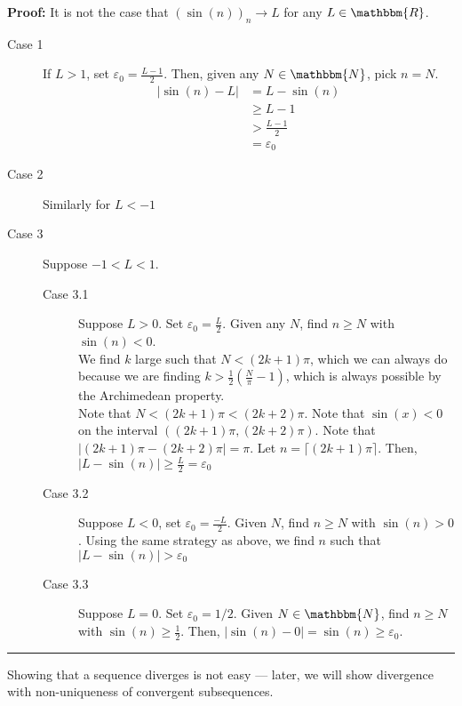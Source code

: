 \documentclass[10pt]{extarticle}
\newcommand{\N}{\mathbbm{N}}
\newcommand{\R}{\mathbbm{R}}
\begin{document}
      \textbf{Proof:} It is not the case that $\left(\sin(n)\right)_n \rightarrow L$ for any $L\in\R$.
      \begin{description}
        \item[Case 1] If $L > 1$, set $\varepsilon_0 = \frac{L-1}{2}$. Then, given any $N\in\N$, pick $n = N$.
          \begin{align*}
            |\sin(n)-L| &= L-\sin(n)\\
                        &\geq L-1\\
                        &> \frac{L-1}{2}\\
                        &= \varepsilon_0
          \end{align*}
        \item[Case 2] Similarly for $L < -1$
        \item[Case 3] Suppose $-1 < L < 1$.
          \begin{description}
            \item[Case 3.1] Suppose $L > 0$. Set $\varepsilon_0 = \frac{L}{2}$. Given any $N$, find $n \geq N$ with $\sin(n) < 0$. \\

              We find $k$ large such that $N < (2k+1)\pi$, which we can always do because we are finding $k > \frac{1}{2}\left(\frac{N}{\pi} - 1\right)$, which is always possible by the Archimedean property.\\

              Note that $N < (2k+1)\pi < (2k+2)\pi$. Note that $\sin(x) < 0$ on the interval $((2k+1)\pi,(2k+2)\pi)$. Note that $|(2k+1)\pi - (2k+2)\pi| = \pi$. Let $n = \lceil (2k+1)\pi\rceil$. Then, $|L-\sin(n)| \geq \frac{L}{2} = \varepsilon_0$
            \item[Case 3.2] Suppose $L < 0$, set $\varepsilon_0 = \frac{-L}{2}$. Given $N$, find $n \geq N$ with $\sin(n) > 0$. Using the same strategy as above, we find $n$ such that $|L - \sin(n)| > \varepsilon_0$
            \item[Case 3.3] Suppose $L = 0$. Set $\varepsilon_0 = 1/2$. Given $N\in\N$, find $n\geq N$ with $\sin(n) \geq \frac{1}{2}$. Then, $|\sin(n)-0| = \sin(n) \geq \varepsilon_0$.
          \end{description}
      \end{description}
      \begin{center}
        \rule{0.5\textwidth}{0.4pt}
      \end{center}
    Showing that a sequence diverges is not easy --- later, we will show divergence with non-uniqueness of convergent subsequences.
\end{document}
